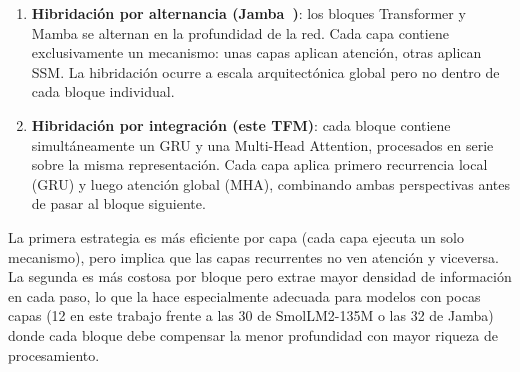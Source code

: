 \begin{enumerate}
    \item \textbf{Hibridación por alternancia (Jamba~\cite{lieber2024jamba})}: los bloques Transformer y Mamba se alternan en la profundidad de la red. Cada capa contiene exclusivamente un mecanismo: unas capas aplican atención, otras aplican SSM. La hibridación ocurre a escala arquitectónica global pero no dentro de cada bloque individual.

    \item \textbf{Hibridación por integración (este TFM)}: cada bloque contiene simultáneamente un GRU y una Multi-Head Attention, procesados en serie sobre la misma representación. Cada capa aplica primero recurrencia local (GRU) y luego atención global (MHA), combinando ambas perspectivas antes de pasar al bloque siguiente.
\end{enumerate}

La primera estrategia es más eficiente por capa (cada capa ejecuta un solo mecanismo), pero implica que las capas recurrentes no ven atención y viceversa. La segunda es más costosa por bloque pero extrae mayor densidad de información en cada paso, lo que la hace especialmente adecuada para modelos con pocas capas (12 en este trabajo frente a las 30 de SmolLM2-135M o las 32 de Jamba) donde cada bloque debe compensar la menor profundidad con mayor riqueza de procesamiento.
